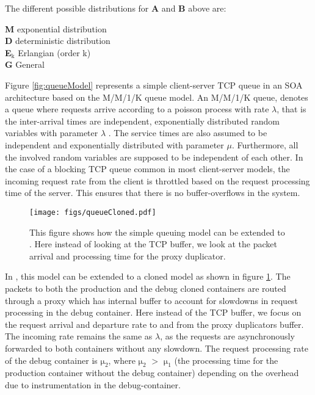 \noindent The different possible distributions for \textbf{A} and \textbf{B} above are:

\begin{framed}
	\noindent \textbf{M} exponential distribution\\
	\textbf{D} deterministic distribution\\
	\textbf{E$_{\text{k}}$} Erlangian (order k)\\
	\textbf{G} General
\end{framed}



Figure \ref{fig:queueModel} represents a simple client-server TCP queue in an SOA architecture based on the M/M/1/K queue model.
An M/M/1/K queue, denotes a queue where requests arrive according to a poisson process with rate $\lambda$, that is the inter-arrival times are independent, exponentially distributed random variables with parameter $\lambda$ .
The service times are also assumed to be independent and exponentially distributed with parameter $\mu$. 
Furthermore, all the involved random variables are supposed to be independent of each other.
In the case of a blocking TCP queue common in most client-server models, the incoming request rate from the client is throttled based on the request processing time of the server. 
This ensures that there is no buffer-overflows in the system.

\begin{figure}[h]
	\begin{center}
		\texttt{[image: figs/queueCloned.pdf]}
		\caption{This figure shows how the simple queuing model can be extended to \parikshan. Here instead of looking at the TCP buffer, we look at the packet arrival and processing time for the proxy duplicator.}
		\label{fig:queueClonedModel}
	\end{center}
\end{figure}

In \parikshan, this model can be extended to a cloned model as shown in figure \ref{fig:queueClonedModel}.
The packets to both the production and the debug cloned containers are routed through a proxy which has internal buffer to account for slowdowns in request processing in the debug container. 
Here instead of the TCP buffer, we focus on the request arrival and departure rate to and from the proxy duplicators buffer.
The incoming rate remains the same as $\lambda$, as the requests are asynchronously forwarded to both containers without any slowdown. 
The request processing rate of the debug container is $\mathrm{\mu_{2}}$, where $\mathrm{\mu_{2}}$ $>$ $\mathrm{\mu_{1}}$ (the processing time for the production container without the debug container) depending on the overhead due to instrumentation in the debug-container.

